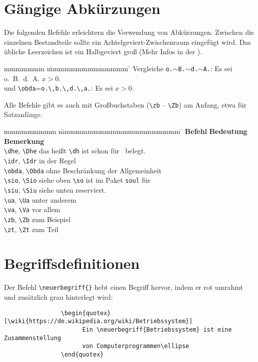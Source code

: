 		\newpage
		\section{Gängige Abkürzungen}
			Die folgenden Befehle erleichtern die Verwendung von Abkürzungen. Zwischen die einzelnen Bestandteile sollte ein Achtelgeviert-Zwischenraum eingefügt wird. Das übliche Leerzeichen ist \idr ein Halbgeviert groß (Mehr Infos in der ).
			\begin{tabbing}
				mmmmmmm			\= mmmmmmmmmmmmmm						\= \kill
				Vergleiche		\>\texttt{o.$\sim$B.$\sim$d.$\sim$A.}:	\> Es sei o.~B.~d.~A. $x>0$.\\
				und				\>\verb|\obda|=\verb|o.\,b.\,d.\,a.|:	\> Es sei \obda $x>0$.
			\end{tabbing}
			Alle Befehle gibt es auch mit Großbuchstaben (\verb|\zb| -- \verb|\Zb|) am Anfang, etwa für Satzanfänge.
			\begin{tabbing}
				mmmmmmmmm						\= mmmmmmmmmmmmmmmmmmmmm		\=\kill
				\textbf{Befehl}					\> \textbf{Bedeutung}			\> \textbf{Bemerkung}								\\
				\verb|\dhe|, \verb|\Dhe|		\> das heißt 					\> \verb|\dh| ist schon für \dh\ belegt.			\\
				\verb|\idr|, \verb|\Idr|		\> in der Regel																		\\
				\verb|\obda|, \verb|\Obda|		\> ohne Beschränkung der Allgemeinheit 												\\
				\verb|\sio|, \verb|\Sio|		\> siehe oben 					\> \verb|\so| ist im Paket \texttt{soul} für 		\\
				\verb|\siu|, \verb|\Siu|		\> siehe unten					\> \so{gesperrt} reserviert.						\\
				\verb|\ua|, \verb|\Ua|			\> unter anderem																	\\
				\verb|\va|, \verb|\Va|			\> vor allem																		\\
				\verb|\zb|, \verb|\Zb|			\> zum Beispiel																		\\
				\verb|\zt|,	\verb|\Zt|			\> zum Teil
			\end{tabbing}
		\section{Begriffsdefinitionen}
			\label{begriffsdefinitionen}
			Der Befehl \verb|\neuerbegriff{}| hebt einen Begriff hervor, indem er rot umrahmt und zusätzlich grau hinterlegt wird:
			\begin{verbatim}
				\begin{quotex}[\wiki{https://de.wikipedia.org/wiki/Betriebssystem}]
				      Ein \neuerbegriff{Betriebssystem} ist eine Zusammenstellung
				      von Computerprogrammen\ellipse
				\end{quotex}
			\end{verbatim}

